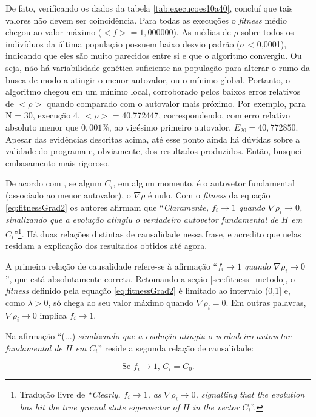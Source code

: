 	De fato, verificando os dados da tabela \ref{tab:execucoes10a40}, concluí que tais valores não devem ser coincidência. Para todas as execuções o \textit{fitness} médio chegou ao valor máximo \mbox{($<f> = 1,000000$)}. As médias de $\rho$ sobre todos os indivíduos da última população possuem baixo desvio padrão ($\sigma$ < 0,0001), indicando que eles são muito parecidos entre si e que o algoritmo convergiu. Ou seja, não há variabilidade genética suficiente na população para alterar o rumo da busca de modo a atingir o menor autovalor, ou o mínimo global. Portanto, o algoritmo chegou em um mínimo local, corroborado pelos baixos erros relativos de $<\rho>$ quando comparado com o autovalor mais próximo. Por exemplo, para N = 30, execução 4,  $<\rho>$ = 40,772447, correspondendo, com erro relativo absoluto menor que $0,001\%$, ao vigésimo primeiro autovalor, $E_{20} = 40,772850$. Apesar das evidências descritas acima, até esse ponto ainda há dúvidas sobre a validade do programa e, obviamente, dos resultados produzidos. Então, busquei embasamento mais rigoroso.

De acordo com \cite{metodo2004}, se algum $C_i$, em algum momento, é o autovetor fundamental (associado ao menor autovalor), o $\nabla \rho$ é nulo. Com o \textit{fitness} da equação \eqref{eq:fitnessGrad2} os autores afirmam que ``\textit{Claramente, $f_i \rightarrow 1$ quando $\nabla \rho_i \rightarrow 0$, sinalizando que a evolução atingiu o verdadeiro autovetor fundamental de $H$ em $C_i$}''\footnote{Tradução livre de ``\textit{Clearly, $f_i \rightarrow 1$, as $\nabla \rho_i \rightarrow 0$, signalling that the evolution has hit the true ground state eigenvector of $H$ in the vector $C_i$}''.}. Há duas relações distintas de causalidade nessa frase, e acredito que nelas residam a explicação dos resultados obtidos até agora.

A primeira relação de causalidade refere-se à afirmação ``\textit{$f_i \rightarrow 1$ quando $\nabla \rho_i \rightarrow 0$}'', que está absolutamente correta. Retomando a seção \ref{sec:fitness_metodo}, o \textit{fitness} definido pela equação \ref{eq:fitnessGrad2} é limitado ao intervalo (0,1] e, como $\lambda > 0$, só chega ao seu valor máximo quando $\nabla \rho_i = 0$. Em outras palavras, $\nabla \rho_i \rightarrow 0$ implica $f_i \rightarrow 1$.

Na afirmação ``(...) \textit{sinalizando que a evolução atingiu o verdadeiro autovetor fundamental de $H$ em $C_i$}'' reside a segunda relação de causalidade:

\begin{equation}\label{eq:afirmacaoErrada}
	\mbox{Se } f_i \rightarrow 1\mbox{, } C_i = C_0.
\end{equation}

